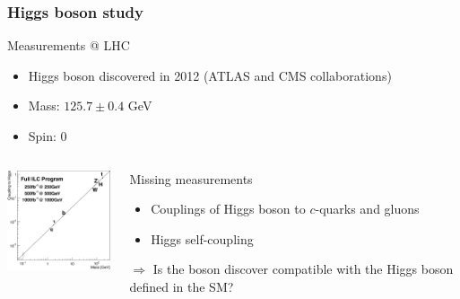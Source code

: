 \documentclass{beamer}
\begin{document}
    \begin{frame}
      \frametitle{Higgs boson study}

      \vspace{-0.3cm}
      \begin{block}{Measurements @ LHC}
        \begin{itemize}
          \item Higgs boson discovered in 2012 (ATLAS and CMS collaborations)
          \item Mass: $125.7 \pm 0.4$ GeV
          \item Spin: 0
        \end{itemize}
      \end{block}
          
      \vspace{-0.1cm}
      \begin{columns}[c] 

        \begin{column}{5cm}
          \centering
          \includegraphics[width = 4cm]{Pictures/Chapter_Theory_figs_mass-coupling1TeV.png}
        \end{column}
        \begin{column}{5cm}
          \centering
          \begin{alertblock}{Missing measurements}
            \begin{itemize}
              \item Couplings of Higgs boson to $c$-quarks and gluons
              \item Higgs self-coupling 
            \end{itemize}
            \centering
            $\Rightarrow$ Is the boson discover compatible with the Higgs boson defined in the SM?
          \end{alertblock}
        \end{column}

      \end{columns}

    \end{frame}
\end{document}
